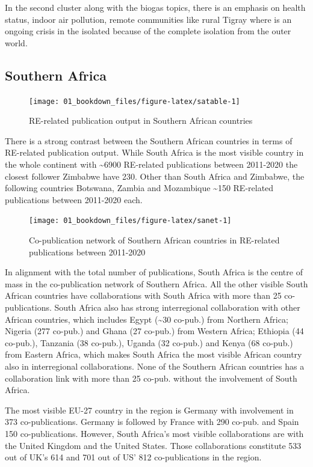 \documentclass[
]{book}
\begin{document}
In the second cluster along with the biogas topics, there is an emphasis on health status, indoor air pollution, remote communities like rural Tigray where is an ongoing crisis in the isolated because of the complete isolation from the outer world.

\hypertarget{southern-africa}{%
\subsection{Southern Africa}\label{southern-africa}}

\begin{figure}
\texttt{[image: 01\_bookdown\_files/figure-latex/satable-1]} \caption{RE-related publication output in Southern African countries}\label{fig:satable}
\end{figure}

There is a strong contrast between the Southern African countries in terms of RE-related publication output. While South Africa is the most visible country in the whole continent with \textasciitilde6900 RE-related publications between 2011-2020 the closest follower Zimbabwe have 230. Other than South Africa and Zimbabwe, the following countries Botswana, Zambia and Mozambique \textasciitilde150 RE-related publications between 2011-2020 each.

\begin{figure}
\texttt{[image: 01\_bookdown\_files/figure-latex/sanet-1]} \caption{Co-publication network of Southern African countries in RE-related publications between 2011-2020}\label{fig:sanet}
\end{figure}

In alignment with the total number of publications, South Africa is the centre of mass in the co-publication network of Southern Africa. All the other visible South African countries have collaborations with South Africa with more than 25 co-publications. South Africa also has strong interregional collaboration with other African countries, which includes Egypt (\textasciitilde30 co-pub.) from Northern Africa; Nigeria (277 co-pub.) and Ghana (27 co-pub.) from Western Africa; Ethiopia (44 co-pub.), Tanzania (38 co-pub.), Uganda (32 co-pub.) and Kenya (68 co-pub.) from Eastern Africa, which makes South Africa the most visible African country also in interregional collaborations. None of the Southern African countries has a collaboration link with more than 25 co-pub. without the involvement of South Africa.

The most visible EU-27 country in the region is Germany with involvement in 373 co-publications. Germany is followed by France with 290 co-pub. and Spain 150 co-publications. However, South Africa's most visible collaborations are with the United Kingdom and the United States. Those collaborations constitute 533 out of UK's 614 and 701 out of US' 812 co-publications in the region.
\end{document}
